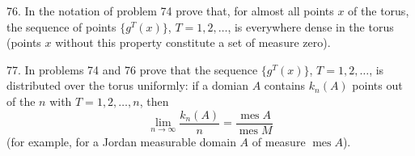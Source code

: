 \begin{problem}{76.}
	In the notation of problem 74 prove that, for almost all points $x$ of the torus,
	the sequence of points $\{g^T (x)\}$, $T=1, 2, \dotsc$, is everywhere dense in the torus
	(points $x$ without this property constitute a set of measure zero).
\end{problem}

\begin{problem}{77.}
	In problems 74 and 76 prove that the sequence $\{g^T (x)\}$, $T=1, 2, \dotsc$, is distributed
	over the torus uniformly: if a domian $A$ contains $k_n(A)$ points out of the $n$ with $T=1, 2, \dotsc,n$, then
	\begin{equation*}
	\lim_{n \to \infty} \frac{k_n(A)}{n}=\frac{\operatorname{mes} A}{\operatorname{mes} M}
	\end{equation*}
	(for example, for a Jordan measurable domain $A$ of measure $\operatorname{mes} A$).
\end{problem}


